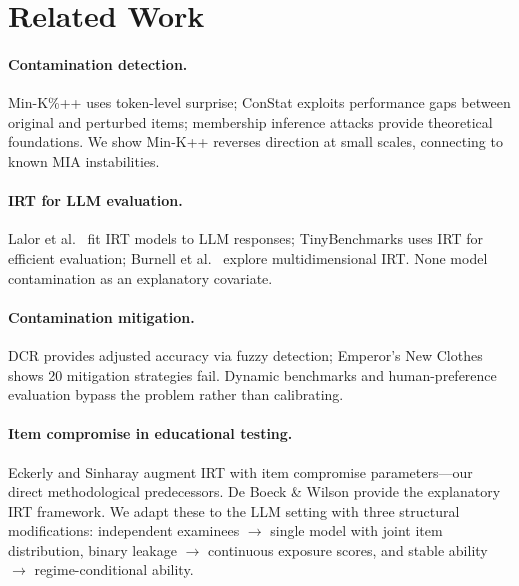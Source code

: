 \documentclass[11pt,a4paper]{article}
\begin{document}
\section{Related Work}

\paragraph{Contamination detection.} Min-K\%++ \cite{shi2024detecting} uses token-level surprise; ConStat \cite{golchin2024time} exploits performance gaps between original and perturbed items; membership inference attacks \cite{shokri2017membership,carlini2022quantifying} provide theoretical foundations. We show Min-K++ reverses direction at small scales, connecting to known MIA instabilities.

\paragraph{IRT for LLM evaluation.} Lalor et al.\ \cite{lalor2024benchmarking} fit IRT models to LLM responses; TinyBenchmarks \cite{polo2024tinybenchmarks} uses IRT for efficient evaluation; Burnell et al.\ \cite{burnell2023revealing} explore multidimensional IRT. None model contamination as an explanatory covariate.

\paragraph{Contamination mitigation.} DCR \cite{oren2024proving} provides adjusted accuracy via fuzzy detection; Emperor's New Clothes \cite{dekoninck2025emperor} shows 20 mitigation strategies fail. Dynamic benchmarks \cite{white2024livebench} and human-preference evaluation \cite{zheng2024judging} bypass the problem rather than calibrating.

\paragraph{Item compromise in educational testing.} Eckerly \cite{eckerly2017detecting} and Sinharay \cite{sinharay2017assessing} augment IRT with item compromise parameters---our direct methodological predecessors. De Boeck \& Wilson \cite{deboeck2004explanatory} provide the explanatory IRT framework. We adapt these to the LLM setting with three structural modifications: independent examinees $\to$ single model with joint item distribution, binary leakage $\to$ continuous exposure scores, and stable ability $\to$ regime-conditional ability.
\end{document}
